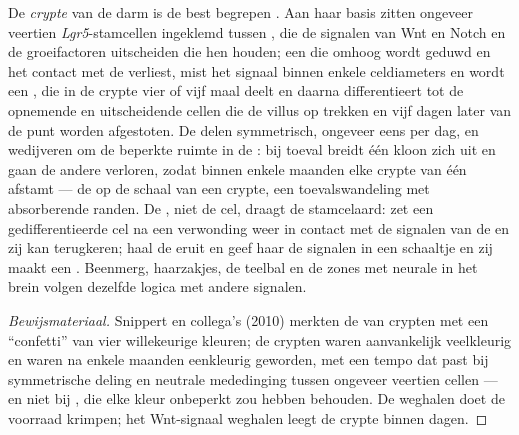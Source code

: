 \begin{proposition}\label{prop:b3:stem-cells:crypt}
De \emph{crypte} van de darm is de best begrepen . Aan haar basis
zitten ongeveer veertien \emph{Lgr5}-stamcellen ingeklemd tussen
, die de signalen van Wnt en Notch en de groeifactoren
uitscheiden die hen  houden; een  die omhoog wordt geduwd
en het contact met de  verliest, mist het signaal binnen
enkele celdiameters en wordt een , die in de
crypte vier of vijf maal deelt en daarna differentieert tot de
opnemende en uitscheidende cellen die de villus op trekken en vijf
dagen later van de punt worden afgestoten. De  delen
symmetrisch, ongeveer eens per dag, en wedijveren om de beperkte ruimte
in de : bij toeval breidt één kloon zich uit en gaan de andere
verloren, zodat binnen enkele maanden elke crypte van één 
afstamt --- de \emph{} op de schaal van een crypte, een
toevalswandeling met absorberende randen. De , niet de cel, draagt
de stamcelaard: zet een gedifferentieerde cel na een verwonding weer in
contact met de signalen van de  en zij kan terugkeren; haal
de  eruit en geef haar de signalen in een schaaltje en zij maakt
een . Beenmerg, haarzakjes, de teelbal en de zones met neurale
 in het brein volgen dezelfde logica met andere signalen.
\end{proposition}
\begin{proof}[Bewijsmateriaal]
Snippert en collega's (2010) merkten de  van crypten met een
``confetti'' van vier willekeurige kleuren; de crypten waren
aanvankelijk veelkleurig en waren na enkele maanden eenkleurig
geworden, met een tempo dat past bij symmetrische deling en neutrale
mededinging tussen ongeveer veertien cellen --- en niet bij
, die elke kleur onbeperkt zou hebben behouden. De
 weghalen doet de voorraad  krimpen; het
Wnt-signaal weghalen leegt de crypte binnen dagen.
\end{proof}

